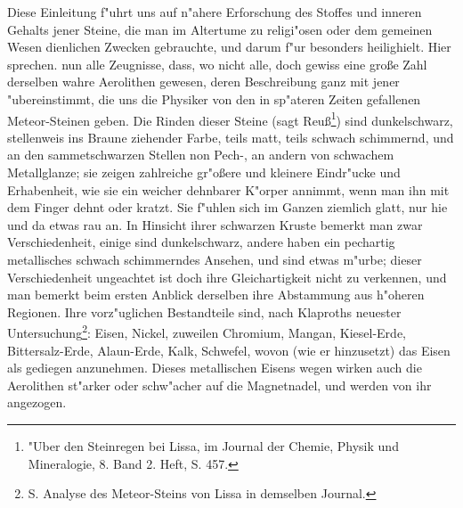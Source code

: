 \documentclass[a4paper, 11pt, oneside, polutonikogreek, german]{article}
\begin{document}
Diese Einleitung f"uhrt uns auf n"ahere Erforschung des Stoffes und inneren Gehalts jener Steine, die man im Altertume zu religi"osen oder dem gemeinen Wesen dienlichen Zwecken gebrauchte, und darum f"ur besonders heilighielt. Hier sprechen. nun alle Zeugnisse, dass, wo nicht alle, doch gewiss eine große Zahl derselben wahre Aerolithen gewesen, deren Beschreibung ganz mit jener "ubereinstimmt, die uns die Physiker von den in sp"ateren Zeiten gefallenen Meteor-Steinen geben. Die Rinden dieser Steine (sagt Reuß\footnote{"Uber den Steinregen bei Lissa, im Journal der Chemie, Physik und Mineralogie, 8. Band 2. Heft, S. 457.}) sind dunkelschwarz, stellenweis ins Braune ziehender Farbe, teils matt, teils schwach schimmernd, und an den sammetschwarzen Stellen non Pech-, an andern von schwachem Metallglanze; sie zeigen zahlreiche gr"oßere und kleinere Eindr"ucke und Erhabenheit, wie sie ein weicher dehnbarer K"orper annimmt, wenn man ihn mit dem Finger dehnt oder kratzt. Sie f"uhlen sich im Ganzen ziemlich glatt, nur hie und da etwas rau an. In Hinsicht ihrer schwarzen Kruste bemerkt man zwar Verschiedenheit, einige sind dunkelschwarz, andere haben ein pechartig metallisches schwach schimmerndes Ansehen, und sind etwas m"urbe; dieser Verschiedenheit ungeachtet ist doch ihre Gleichartigkeit nicht zu verkennen, und man bemerkt beim ersten Anblick derselben ihre Abstammung aus h"oheren Regionen. Ihre vorz"uglichen Bestandteile sind, nach Klaproths neuester Untersuchung\footnote{S. Analyse des Meteor-Steins von Lissa in demselben Journal.}: Eisen, Nickel, zuweilen Chromium, Mangan, Kiesel-Erde, Bittersalz-Erde, Alaun-Erde, Kalk, Schwefel, wovon (wie er hinzusetzt) das Eisen als gediegen anzunehmen. Dieses metallischen Eisens wegen wirken auch die Aerolithen st"arker oder schw"acher auf die Magnetnadel, und werden von ihr angezogen.
\end{document}
